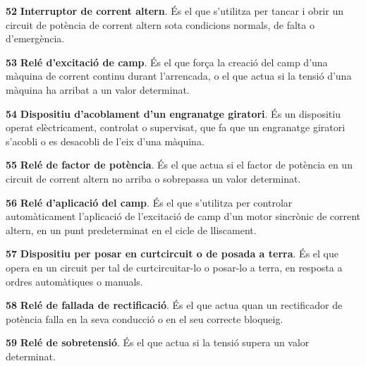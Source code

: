 \begin{multicols}{2}
\begin{list}{}
\item[\textbf{52}]   
\textbf{Interruptor de corrent altern}. És
 el que s'utilitza per tancar i obrir un circuit de potència de corrent altern sota condicions
normals, de falta o d'emergència.

\item[\textbf{53}]  
\textbf{Relé d'excitació de camp}. És el
que força la creació del camp d'una màquina de corrent continu
durant l'arrencada, o el que actua si la tensió d'una màquina ha
arribat a un valor determinat.

\item[\textbf{54}]  
\textbf{Dispositiu d'acoblament d'un engranatge giratori}. És un dispositiu operat elèctricament, controlat o supervisat, que fa que un engranatge giratori
s'acobli o es desacobli de l'eix d'una màquina.

\item[\textbf{55}]   
\textbf{Relé de factor de potència}. És el que actua si el factor de potència en un circuit de corrent altern no arriba o
sobrepassa un valor determinat.

\item[\textbf{56}]   
\textbf{Relé d'aplicació del camp}.
És el que s'utilitza per controlar automàticament l'aplicació de l'excitació de camp d'un
motor sincrònic de corrent altern, en un punt predeterminat en el cicle de lliscament.

\item[\textbf{57}]  
\textbf{Dispositiu per posar en  curtcircuit o de posada a terra}. És el que
opera en un circuit per tal de curtcircuitar-lo  o
posar-lo a terra, en resposta a ordres automàtiques o manuals.

\item[\textbf{58}]   
\textbf{Relé de fallada de rectificació}. És el que actua quan un rectificador de potència falla en la seva conducció o en el seu correcte bloqueig.

\item[\textbf{59}]   
\textbf{Relé de sobretensió}. És el que
actua si la tensió supera un valor determinat.


\end{list}
\end{multicols}
